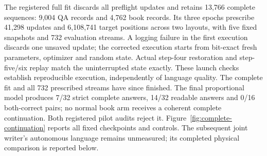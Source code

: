 The registered full fit discards all preflight updates and retains 13,766
complete sequences: 9,004 QA records and 4,762 book records. Its three epochs
prescribe 41,298 updates and 6,108,741 target positions across two layouts,
with five fixed snapshots and 732 evaluation streams. A logging failure in
the first execution discards one unsaved update; the corrected execution starts
from bit-exact fresh parameters, optimizer and random state. Actual step-four
restoration and step-five/six replay match the uninterrupted state exactly.
These launch checks establish reproducible execution, independently of language
quality. The complete fit and all 732 prescribed streams have since finished.
The final proportional model produces 7/32 strict complete answers, 14/32
readable answers and 0/16 both-correct pairs; no normal book arm receives a
coherent complete continuation. Both registered pilot audits reject it.
Figure~\ref{fig:complete-continuation} reports all fixed checkpoints and controls.
The subsequent joint writer's autonomous language remains unmeasured; its
completed physical comparison is reported below.

